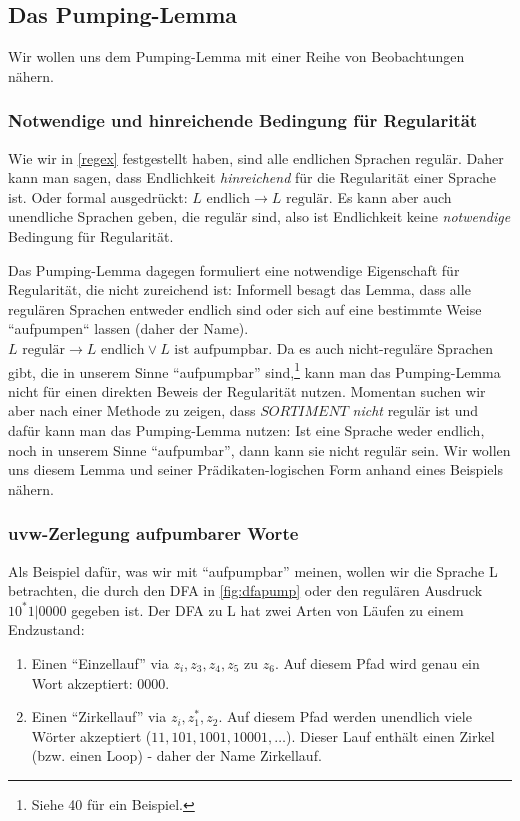 \subsection{Das Pumping-Lemma}

Wir wollen uns dem Pumping-Lemma mit einer Reihe von Beobachtungen nähern.

\subsubsection{Notwendige und hinreichende Bedingung für Regularität}

Wie wir in \autoref{regex} festgestellt haben, sind alle endlichen Sprachen regulär.
Daher kann man sagen, dass Endlichkeit \emph{hinreichend} für die Regularität einer Sprache ist.
Oder formal ausgedrückt: $L \text{ endlich} \rightarrow L \text{ regulär}$.
Es kann aber auch unendliche Sprachen geben, die regulär sind,
also ist Endlichkeit keine \emph{notwendige} Bedingung für Regularität.

Das Pumping-Lemma dagegen formuliert eine notwendige Eigenschaft für Regularität,
die nicht zureichend ist:
Informell besagt das Lemma,
dass alle regulären Sprachen entweder endlich sind
oder sich auf eine bestimmte Weise ``aufpumpen`` lassen (daher der Name).
 $L \text{ regulär} \rightarrow L \text{ endlich} \vee L \text{ ist aufpumpbar}$.
Da es auch nicht-reguläre Sprachen gibt, die in unserem Sinne ``aufpumpbar'' sind,\footnote{
    Siehe \cite{schoening} 40 für ein Beispiel.}
kann man das Pumping-Lemma nicht für einen direkten Beweis der Regularität nutzen.
Momentan suchen wir aber nach einer Methode zu zeigen,
dass $SORTIMENT$ \emph{nicht} regulär ist
und dafür kann man das Pumping-Lemma nutzen:
Ist eine Sprache weder endlich, noch in unserem Sinne ``aufpumbar'',
dann kann sie nicht regulär sein.
Wir wollen uns diesem Lemma und seiner Prädikaten-logischen Form anhand eines Beispiels nähern.

\subsubsection{uvw-Zerlegung aufpumbarer Worte}

Als Beispiel dafür, was wir mit ``aufpumpbar'' meinen,
wollen wir die Sprache L betrachten, die durch den DFA in \autoref{fig:dfapump}
oder den regulären Ausdruck $10^*1|0000$ gegeben ist.
Der DFA zu L hat zwei Arten von Läufen zu einem Endzustand:
\begin{enumerate}
    \item Einen ``Einzellauf'' via $z_i, z_3, z_4, z_5$ zu $z_6$.
        Auf diesem Pfad wird genau ein Wort akzeptiert: $0000$.
    \item Einen ``Zirkellauf'' via $z_i, z_1^*, z_2$.
        Auf diesem Pfad werden unendlich viele Wörter akzeptiert ($11, 101, 1001, 10001, \ldots$).
        Dieser Lauf enthält einen Zirkel (bzw. einen Loop) - daher der Name Zirkellauf.
\end{enumerate}

